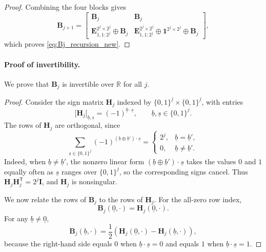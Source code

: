 \documentclass[letterpaper,draftclsnofoot,onecolumn]{IEEEtran}
\begin{document}
{\begin{proof}
Combining the four blocks gives
\begin{equation}
\mathbf{B}_{j+1}
=
\begin{bmatrix}
\mathbf{B}_j & \mathbf{B}_j\\
\mathbf{E}_{1,1:2^j}^{2^j\times 2^j}\oplus \mathbf{B}_j &
\mathbf{E}_{1,1:2^j}^{2^j\times 2^j}\oplus \mathbf{1}^{2^j\times 2^j}\oplus \mathbf{B}_j
\end{bmatrix},
\end{equation}
which proves \eqref{eq:Bj_recursion_new}.
\end{proof}

\paragraph{Proof of invertibility.}
We prove that $\mathbf{B}_j$ is invertible over $\mathbb{R}$ for all $j$.
\begin{proof}
Consider the sign matrix $\mathbf{H}_j$ indexed by $\{0,1\}^j\times\{0,1\}^j$, with entries
\begin{equation}
\bigl[\mathbf{H}_j\bigr]_{\underline{b},\underline{s}}
=
(-1)^{\underline{b}\cdot\underline{s}},
\qquad
\underline{b},\underline{s}\in\{0,1\}^j .
\end{equation}
The rows of $\mathbf{H}_j$ are orthogonal, since
\begin{equation}
\sum_{\underline{s}\in\{0,1\}^j}
(-1)^{(\underline{b}\oplus\underline{b}')\cdot\underline{s}}
=
\begin{cases}
2^j, & \underline{b}=\underline{b}',\\
0, & \underline{b}\neq \underline{b}'.
\end{cases}
\end{equation}
Indeed, when $\underline{b}\neq \underline{b}'$, the nonzero linear form $(\underline{b}\oplus\underline{b}')\cdot\underline{s}$ takes the values $0$ and $1$ equally often as $\underline{s}$ ranges over $\{0,1\}^j$, so the corresponding signs cancel.
Thus $\mathbf{H}_j\mathbf{H}_j^{\mathsf T}=2^j\mathbf{I}$, and $\mathbf{H}_j$ is nonsingular.

We now relate the rows of $\mathbf{B}_j$ to the rows of $\mathbf{H}_j$. For the all-zero row index,
\begin{equation}
\mathbf{B}_j(\underline{0},\cdot)
=
\mathbf{H}_j(\underline{0},\cdot).
\end{equation}
For any $\underline{b}\neq\underline{0}$,
\begin{equation}
\mathbf{B}_j(\underline{b},\cdot)
=
\frac{1}{2}\left(
\mathbf{H}_j(\underline{0},\cdot)
-
\mathbf{H}_j(\underline{b},\cdot)
\right),
\end{equation}
because the right-hand side equals $0$ when $\underline{b}\cdot\underline{s}=0$ and equals $1$ when $\underline{b}\cdot\underline{s}=1$.


\end{proof}}
\end{document}
